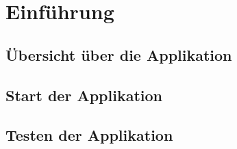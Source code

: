 \chapter{Einführung}

\section{Übersicht über die Applikation}

\section{Start der Applikation}

\section{Testen der Applikation}

